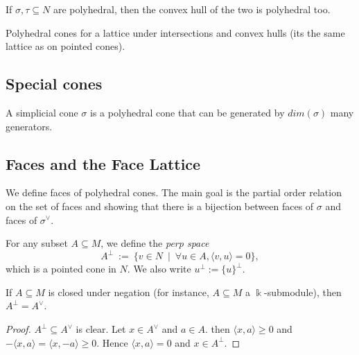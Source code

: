 \begin{proposition}
  \label{convex-hull-polyhedral-cone}
  If \( \sigma, \tau \subseteq N \) are
  polyhedral, then the convex hull of the two is polyhedral too.
\end{proposition}

\begin{proposition}
  \label{polyhedra-lattice}
  Polyhedral cones for a lattice under intersections and convex hulls (its the same lattice as on pointed cones).
\end{proposition}

\subsection{Special cones}

\begin{proposition}
  \label{simplicial-cone}
  A simplicial cone \(\sigma\) is a polyhedral cone that can be generated by \(dim (\sigma)\) many
  generators.
\end{proposition}

\subsection{Faces and the Face Lattice}

We define faces of polyhedral cones. The main goal is the partial
order relation on the set of faces and showing that there is a
bijection between faces of \( \sigma \) and faces of \( \sigma^{\vee}
\).

\begin{definition}
  \label{perp}
  \uses{}
  For any subset \( A \subseteq M \), we define the \emph{perp space}
  \[
      A^{\perp}\ :=\ \{v \in N\ \mid\ \forall u \in A, \langle v, u \rangle = 0\},
  \]
  which is a pointed cone in \( N \). We also write \( u^{\perp} :=
  \{u\}^{\perp} \).
\end{definition}

\begin{lemma}
  \label{perp-closed-negation}
  \uses{}
  If \( A \subseteq M \) is closed under negation (for instance, \( A
  \subseteq M \) a \( \Bbbk \)-submodule), then \( A^{\perp} =
  A^{\vee} \).
\end{lemma}
\begin{proof}
  \uses{}
  \( A^{\perp} \subseteq A^{\vee} \) is clear. Let \( x \in A^{\vee}
  \) and \( a \in A \). then \( \langle x, a \rangle \geq 0 \) and \(
  -\langle x, a \rangle = \langle x, -a \rangle \geq 0 \). Hence \(
  \langle x, a \rangle = 0 \) and \( x \in A^{\perp} \).
\end{proof}


